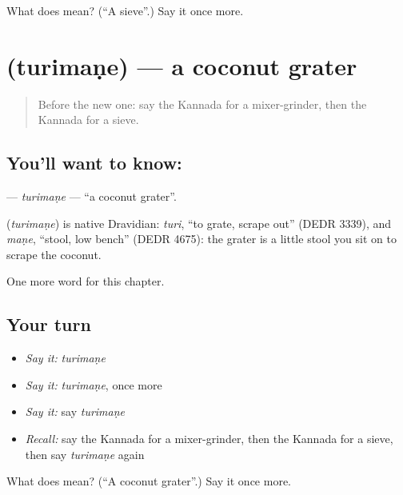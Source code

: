 \begin{tcolorbox}[breakable,colback=teal!4,colframe=teal!35!black,title={Before you move on}]
What does  mean? (\textquotedblleft{}A sieve\textquotedblright{}.) Say it once more.
\end{tcolorbox}
\section[\texorpdfstring{\kn{ತುರಿಮಣೆ} (turimaṇe)}{ತುರಿಮಣೆ (turimaṇe)}]{ (turimaṇe) — a coconut grater}

\label{lesson:KA-C192-turimane}



\begin{quote}
Before the new one: say the Kannada for a mixer-grinder, then the Kannada for a sieve.
\end{quote}

\subsection*{You'll want to know: }
\textbf{} — \emph{turimaṇe} — \textquotedblleft{}a coconut grater\textquotedblright{}.

\begin{cousinweb}
\textbf{} (\emph{turimaṇe}) is native Dravidian: \emph{turi}, \textquotedblleft{}to grate, scrape out\textquotedblright{} (DEDR 3339), and \emph{maṇe}, \textquotedblleft{}stool, low bench\textquotedblright{} (DEDR 4675): the grater is a little stool you sit on to scrape the coconut.
\end{cousinweb}

\begin{grammarlens}[title={What you've built}]
One more word for this chapter.
\end{grammarlens}

\subsection*{Your turn}
\begin{itemize}
\raggedright
  \item \emph{Say it:} \emph{turimaṇe}
  \item \emph{Say it:} \emph{turimaṇe}, once more
  \item \emph{Say it:} say \emph{turimaṇe}
  \item \emph{Recall:} say the Kannada for a mixer-grinder, then the Kannada for a sieve, then say \emph{turimaṇe} again
\end{itemize}

\begin{tcolorbox}[breakable,colback=teal!4,colframe=teal!35!black,title={Before you move on}]
What does  mean? (\textquotedblleft{}A coconut grater\textquotedblright{}.) Say it once more.
\end{tcolorbox}
